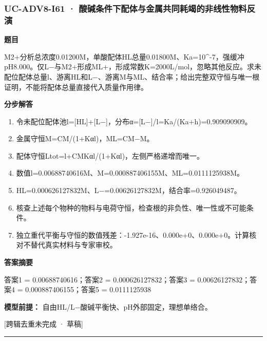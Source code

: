 \documentclass[UTF8,11pt,a4paper]{ctexart}
\begin{document}
\subsubsection*{UC-ADV8-I61 · 酸碱条件下配体与金属共同耗竭的非线性物料反演}
\noindent\textbf{题目}\par
M2+分析总浓度0.01200M，单酸配体HL总量0.01800M、Ka=10\textasciicircum{}-7，强缓冲pH8.000。仅L−与M2+形成ML+，形成常数K=2000L/mol，忽略其他反应。求未配位配体总量l、游离HL和L−、游离M与ML、结合率；给出完整双守恒与唯一根证明，不能将配体总量直接代入质量作用律。\par
\medskip\noindent\textbf{分步解答}
\begin{enumerate}
\item 令未配位配体池l=[HL]+[L−]，分布α=[L−]/l=Ka/(Ka+h)=0.909090909。
\item 金属守恒M=CM/(1+Kαl)，ML=CM−M。
\item 配体守恒Ltot=l+CMKαl/(1+Kαl)，左侧严格递增而唯一。
\item 数值l=0.00688740616M、M=0.000887406155M、ML=0.0111125938M。
\item HL=0.000626127832M、L−=0.00626127832M，结合率=0.926049487。
\item 核查上述每个物种的物料与电荷守恒，检查根的非负性、唯一性或不可能条件。
\item 独立重代平衡与守恒的数值残差：-1.927e-16、0.000e+0、0.000e+0。计算核对不替代真实材料与专家审校。
\end{enumerate}
\noindent\textbf{答案摘要}\par
答案1 = 0.00688740616；答案2 = 0.000626127832；答案3 = 0.00626127832；答案4 = 0.000887406155；答案5 = 0.0111125938\par
\noindent\textbf{模型前提：}
自由HL/L−酸碱平衡快、pH外部固定，理想单络合。\par
\noindent\textcolor{red!65!black}{[跨辑去重未完成 · 草稿]} \par
\medskip\hrule\medskip
{}
\end{document}
